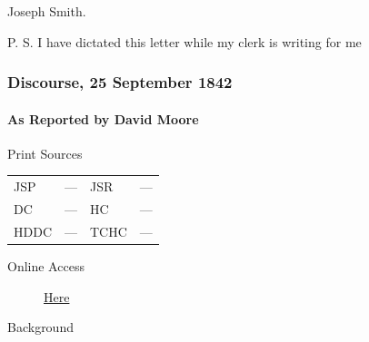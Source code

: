				\begin{tightright}
					Joseph Smith.
				\end{tightright}

				P. S. I have dictated this letter while my clerk is writing for me
				
		\subsubsection{Discourse, 25 September 1842}
			\label{EMS-1842-JS-25-SEP-1842}
			
			\paragraph{As Reported by David Moore}
				\label{EMS-1842-JS-25-SEP-1842-DM}
		
				\begin{description}
					\item[Print Sources]
				\end{description}

				\begin{tabular}{p{0.5in}p{1in}p{0.5in}p{1in}}
					JSP	 	& ---		& JSR 		& --- \\
					DC	 	& ---		& HC 		& --- \\
					HDDC 	& ---		& TCHC 		& --- \\
				\end{tabular}
				
				\begin{description}
					\item[Online Access] \href{https://www.josephsmithpapers.org/paper-summary/discourse-25-september-1842-as-reported-by-david-moore/1}{Here}
				\end{description}
				
				\begin{description}
					\item[Background]
				\end{description}
				
				
